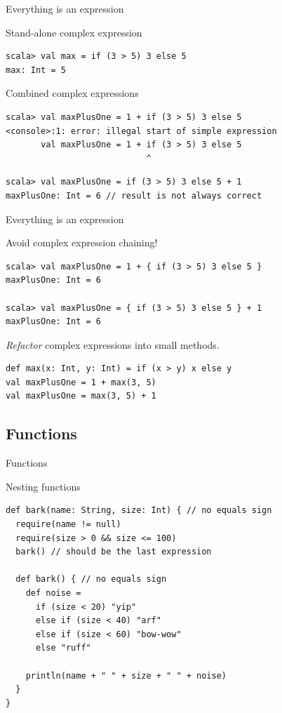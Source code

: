 \begin{frame}[fragile]{Everything is an expression}
\begin{exampleblock}{Stand-alone complex expression }
\begin{lstlisting}
scala> val max = if (3 > 5) 3 else 5
max: Int = 5
\end{lstlisting}
\end{exampleblock}
\pause
\begin{alertblock}{Combined complex expressions}
\begin{lstlisting}
scala> val maxPlusOne = 1 + if (3 > 5) 3 else 5
<console>:1: error: illegal start of simple expression
       val maxPlusOne = 1 + if (3 > 5) 3 else 5
                            ^
\end{lstlisting}
\pause
\begin{lstlisting}
scala> val maxPlusOne = if (3 > 5) 3 else 5 + 1
maxPlusOne: Int = 6 // result is not always correct
\end{lstlisting}
\end{alertblock}
\end{frame}
\begin{frame}[fragile]{Everything is an expression}
\begin{exampleblock}{\alert{Avoid} complex expression chaining!}
\begin{lstlisting}
scala> val maxPlusOne = 1 + { if (3 > 5) 3 else 5 }
maxPlusOne: Int = 6

scala> val maxPlusOne = { if (3 > 5) 3 else 5 } + 1
maxPlusOne: Int = 6
\end{lstlisting}
\end{exampleblock}
\pause
\begin{exampleblock}{\emph{Refactor} complex expressions into small methods.}
\begin{lstlisting}
def max(x: Int, y: Int) = if (x > y) x else y
val maxPlusOne = 1 + max(3, 5)
val maxPlusOne = max(3, 5) + 1
\end{lstlisting}
\end{exampleblock}
\end{frame}


\subsection{Functions}
\begin{frame}[fragile]{Functions}
\begin{alertblock}{Nesting functions}
\begin{lstlisting}
def bark(name: String, size: Int) { // no equals sign
  require(name != null)
  require(size > 0 && size <= 100)
  bark() // should be the last expression

  def bark() { // no equals sign
    def noise =
      if (size < 20) "yip"
      else if (size < 40) "arf"
      else if (size < 60) "bow-wow"
      else "ruff"
        
    println(name + " " + size + " " + noise)
  }
}
\end{lstlisting}
\end{alertblock}
\end{frame}


